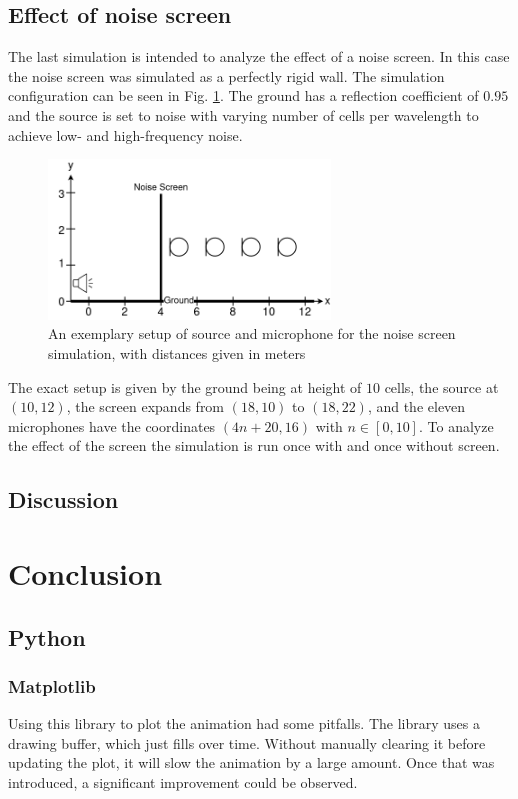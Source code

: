 \documentclass[twocolumn]{article}
\begin{document}
\subsection{Effect of noise screen}
The last simulation is intended to analyze the effect of a noise screen.
In this case the noise screen was simulated as a perfectly rigid wall.
The simulation configuration can be seen in Fig. \ref{fig_3_3_example}.
The ground has a reflection coefficient of $0.95$ and the source is set to noise with varying
number of cells per wavelength to achieve low- and high-frequency noise.

\begin{figure}[H]
    \centering
    \includegraphics[width=75mm]{./Images/tlmfig_3_3.png}
    \caption{An exemplary setup of source and microphone for the noise screen simulation, with distances given in meters}
    \label{fig_3_3_example}
\end{figure}

The exact setup is given by the ground being at height of $10$ cells, the source at $\left(10,12\right)$, the
screen expands from $\left(18,10\right)$ to $\left(18,22\right)$, and the eleven microphones have the coordinates
$\left(4n+20,16\right)$ with $n\in\left[0,10\right]$.
To analyze the effect of the screen the simulation is run once with and once without screen.
\subsection{Discussion}

\section{Conclusion}

\subsection{Python}
\subsubsection{Matplotlib}
Using this library to plot the animation had some pitfalls.
The library uses a drawing buffer, which just fills over time.
Without manually clearing it before updating the plot, it will slow
the animation by a large amount.
Once that was introduced, a significant improvement could be observed.
\end{document}

